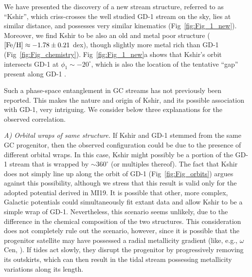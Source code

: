 \documentclass[apj]{emulateapj}
\def\deg{^\circ}
\begin{document}
We have presented the discovery of a new stream structure, referred to as ``Kshir'', which criss-crosses the well studied GD-1 stream on the sky, lies at similar distance, and possesses very similar kinematics (Fig~\ref{fig:Fig_1_new}). Moreover, we find Kshir to be also an old and metal poor structure (${\rm [Fe/H] \approx -1.78\pm0.21}$ dex), though slightly more metal rich than GD-1 (Fig~\ref{fig:Fig_chemistry}). Fig~\ref{fig:Fig_1_new}a shows that Kshir's orbit intersects GD-1 at $\phi_1 \sim -20\deg$, which is also the location of the tentative ``gap'' present along GD-1 \citep{WhelanBonacaGD12018}. 

Such a phase-space entanglement in GC streams has not previously been reported. This makes the nature and origin of Kshir, and its possible association with GD-1, very intriguing. We consider below three explanations for the observed correlation.

{\it A) Orbital wraps of same structure.} If Kshir and GD-1 stemmed from the same GC progenitor, then the observed configuration could be due to the presence of different orbital wraps. In this case, Kshir might possibly be a portion of the GD-1 stream that is wrapped by $\sim 360\deg$ (or multiples thereof). The fact that Kshir does not simply line up along the orbit of GD-1 (Fig~\ref{fig:Fig_orbits}) argues against this possibility, although we stress that this result is valid only for the adopted potential derived in MI19. It is possible that other, more complex, Galactic potentials could simultaneously fit extant data and allow Kshir to be a simple wrap of GD-1. Nevertheless, this scenario seems unlikely, due to the difference in the chemical composition of the two structures. This consideration does not completely rule out the scenario, however, since it is possible that the progenitor satellite may have possessed a  radial metallicity gradient (like, e.g., $\omega$ Cen, \citealt{Johnson2010_omegacen}). If tides act slowly, they disrupt the progenitor by progressively removing its outskirts, which can then result in the tidal stream possessing  metallicity variations along its length.
\end{document}
